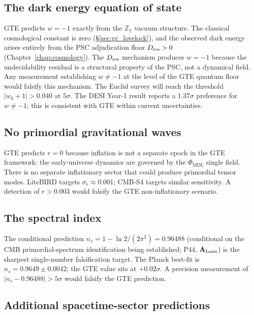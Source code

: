 \documentclass[11pt,openany]{book}
\theoremstyle{remark}
\newcommand{\PHIMDL}{\Phi_{\mathrm{MDL}}}
\newcommand{\ZS}{\mathbb{Z}_7}
\newcommand{\Dres}{D_{\rm res}}
\newcommand{\CatAL}{\ensuremath{\textbf{A}_{\rm Lean}}}
\begin{document}
\subsection*{The dark energy equation of state}

GTE predicts $w = -1$ exactly from the $\ZS$ vacuum structure.
The classical cosmological constant is zero (\S\ref{sec:gr_lovelock}), and the
observed dark energy arises entirely from the PSC adjudication floor $\Dres > 0$
(Chapter~\ref{chap:cosmology}).
The $\Dres$ mechanism produces $w = -1$ because the undecidability residual is a
structural property of the PSC, not a dynamical field.
Any measurement establishing $w \neq -1$ at the level of the GTE quantum floor
would falsify this mechanism.
The Euclid survey will reach the threshold $|w_0 + 1| > 0.040$ at $5\sigma$.
The DESI Year-1 result reports a $1.37\sigma$ preference for $w \neq -1$; this is
consistent with GTE within current uncertainties.

\subsection*{No primordial gravitational waves}

GTE predicts $r = 0$ because inflation is not a separate epoch in the GTE
framework: the early-universe dynamics are governed by the $\PHIMDL$ single field.
There is no separate inflationary sector that could produce primordial tensor modes.
LiteBIRD targets $\sigma_r \approx 0.001$; CMB-S4 targets similar sensitivity.
A detection of $r > 0.003$ would falsify the GTE non-inflationary scenario.

\subsection*{The spectral index}

The conditional prediction $n_s = 1 - \ln 2/(2\pi^2) = 0.96488$
(conditional on the CMB primordial-spectrum identification being established; P44,
\CatAL) is the sharpest single-number falsification target.
The Planck best-fit is $n_s = 0.9649\pm0.0042$; the GTE value sits at $+0.02\sigma$.
A precision measurement of $|n_s - 0.96488| > 5\sigma$ would falsify the GTE
prediction.

\subsection*{Additional spacetime-sector predictions}
\end{document}
